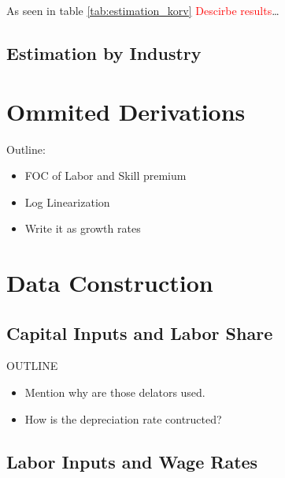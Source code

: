 \documentclass[12pt]{article}
\begin{document}
As seen in table \ref{tab:estimation_korv} \textcolor{red}{Descirbe results}\dots


\subsection{Estimation by Industry}


\pagebreak{}




\pagebreak{}

\appendix

\section{Ommited Derivations}\label{sec:derivations}
Outline:
\begin{itemize}
  \item FOC of Labor and Skill premium
  \item Log Linearization
  \item Write it as growth rates
\end{itemize}

\section{Data Construction}\label{sec:data-construction}


\subsection{Capital Inputs and Labor Share}\label{subsec:capital-inputs-labor-share}
OUTLINE
\begin{itemize}
	\item Mention why are those delators used.
	\item How is the depreciation rate contructed?
\end{itemize}


\subsection{Labor Inputs and Wage Rates}\label{subsec:labor-inputs-wage-rates}
\end{document}
